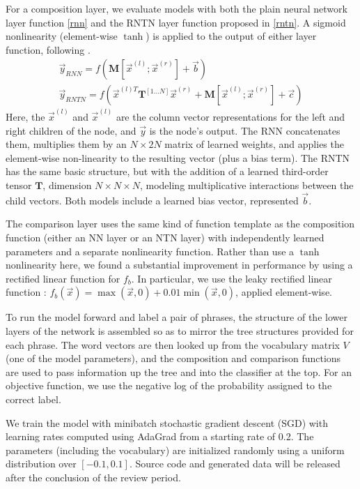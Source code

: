 For a composition layer, we evaluate models with both the plain neural
network layer function \eqref{rnn} and the RNTN layer function
proposed in \citet{chen2013learning} \eqref{rntn}. A sigmoid
nonlinearity (element-wise $\tanh$) is applied to the output of either
layer function, following \cite{socher2013acl1}.
%
\begin{gather} \label{rnn}
\vec{y}_{\textit{RNN}} = f(\mathbf{M} [\vec{x}^{(l)}; \vec{x}^{(r)}] + \vec{b}) \\ %
\label{rntn}
\vec{y}_{\textit{RNTN}} = f(\vec{x}^{(l)T} \mathbf{T}^{[1 \ldots N]} \vec{x}^{(r)} + \mathbf{M} [\vec{x}^{(l)}; \vec{x}^{(r)}] + \vec{c})
\end{gather} %
%
Here, the $\vec{x}^{(l)}$ and $\vec{x}^{(l)}$ are the column vector representations
for the left and right children of the node, and $\vec{y}$ is the node's output.
The RNN concatenates them, multiplies them by an $N \times 2N$
matrix of learned weights, and applies the element-wise non-linearity
to the resulting vector (plus a bias term). The RNTN has the same
basic structure, but with the addition of a learned third-order tensor $\mathbf{T}$,
dimension $N \times N \times N$, modeling multiplicative interactions between the
child vectors. Both models include a learned bias vector, represented $\vec{b}$.

The comparison layer uses the same kind of function template as the
composition function (either an NN layer or an NTN layer) with
independently learned parameters and a separate nonlinearity function.
Rather than use a $\tanh$ nonlinearity here, we found a substantial
improvement in performance by using a rectified linear function for
$f_{b}$. In particular, we use the leaky rectified linear function
\cite{maasrectifier}: $f_{b}(\vec{x})=\max(\vec{x}, 0) +
0.01\min(\vec{x}, 0)$, applied element-wise.

To run the model forward and label a pair of phrases, the structure of
the lower layers of the network is assembled so as to mirror the tree
structures provided for each phrase. The word vectors are then looked
up from the vocabulary matrix $V$ (one of the model parameters), and
the composition and comparison functions are used to pass information
up the tree and into the classifier at the top. For an objective
function, we use the negative log of the probability assigned to the
correct label.

We train the model with minibatch stochastic gradient descent (SGD)
with learning rates computed using AdaGrad \cite{duchi2011adaptive}
from a starting rate of 0.2. The parameters (including the vocabulary)
are initialized randomly using a uniform distribution over $[-0.1,
0.1]$. %
Source code and generated data will be released after the conclusion
of the review period.

